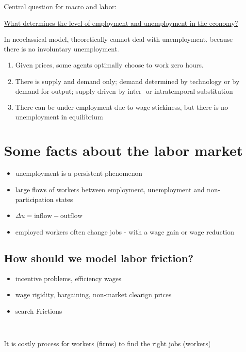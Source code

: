 Central question for macro and labor: 

\underline{What determines the level of employment and unemployment in the economy?}

In neoclassical model, theoretically cannot deal with unemployment,
because there is no involuntary unemployment.
\begin{enumerate}
    \item Given prices, some agents optimally choose to work zero hours.
    \item There is supply and demand only; demand determined by
    technology or by demand for output; supply driven by inter- or
    intratemporal substitution
    \item There can be under-employment due to wage stickiness, but
    there is no unemployment in equilibrium
\end{enumerate}

\section{Some facts about the labor market}

\begin{itemize}
    \item unemployment is a persistent phenomenon
    \item large flows of workers between employment, unemployment
    and non-participation states
    \item $\Delta u = \text{inflow} - \text{outflow}$
    \item employed workers often change jobs - with a wage gain or
    wage reduction
\end{itemize}

\subsection{How should we model labor friction?}

\begin{itemize}
    \item incentive problems, efficiency wages
    \item wage rigidity, bargaining, non-market clearign prices
    \item search Frictions
\end{itemize}

\begin{definition}
    \

    It is costly process for workers (ﬁrms) to ﬁnd the right jobs (workers)
\end{definition}

